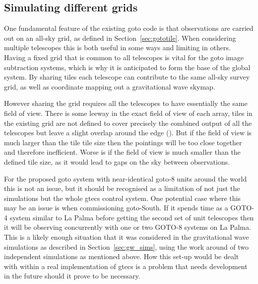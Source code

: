 \begin{colsection}
\begin{colsection}
\clearpage

\end{colsection}


\subsection{Simulating different grids}
\label{sec:multi_grid_scheduling}
\begin{colsection}

One fundamental feature of the existing \gls{goto} code is that observations are carried out on an all-sky grid, as defined in Section~\ref{sec:gototile}. When considering multiple telescopes this is both useful in some ways and limiting in others. Having a fixed grid that is common to all telescopes is vital for the \gls{goto} image subtraction systems, which is why it is anticipated to form the base of the global system. By sharing tiles each telescope can contribute to the same all-sky survey grid, as well as coordinate mapping out a gravitational wave skymap.

However sharing the grid requires all the telescopes to have essentially the same field of view. There is some leeway in the exact field of view of each array, tiles in the existing grid are not defined to cover precisely the combined output of all the telescopes but leave a slight overlap around the edge (). But if the field of view is much larger than the tile tile size then the pointings will be too close together and therefore inefficient. Worse is if the field of view is much smaller than the defined tile size, as it would lead to gaps on the sky between observations.

For the proposed \gls{goto} system with near-identical \gls{goto}-8 units around the world this is not an issue, but it should be recognised as a limitation of not just the simulations but the whole \gls{gtecs} control system. One potential case where this may be an issue is when commissioning \gls{goto}-South. If it spends time as a GOTO-4 system similar to La Palma before getting the second set of unit telescopes then it will be observing concurrently with one or two GOTO-8 systems on La Palma. This is a likely enough situation that it was considered in the gravitational wave simulations as described in Section~\ref{sec:gw_sims}, using the work around of two independent simulations as mentioned above. How this set-up would be dealt with within a real implementation of \gls{gtecs} is a problem that needs development in the future should it prove to be necessary.

\end{colsection}


\end{colsection}

